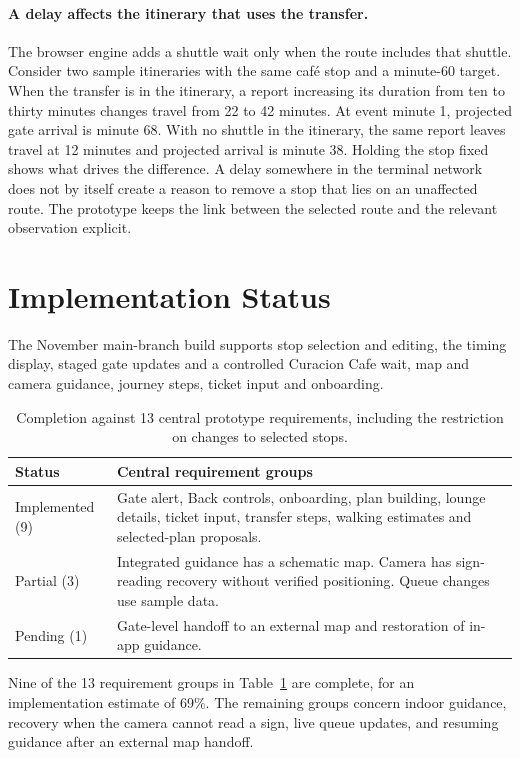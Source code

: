 \documentclass[sigconf,nonacm,balance=false]{acmart}
\begin{document}
\paragraph{A delay affects the itinerary that uses the transfer.}
The browser engine adds a shuttle wait only when the route includes that shuttle. Consider two sample itineraries with the same caf\'e stop and a minute-60 target. When the transfer is in the itinerary, a report increasing its duration from ten to thirty minutes changes travel from 22 to 42 minutes. At event minute 1, projected gate arrival is minute 68. With no shuttle in the itinerary, the same report leaves travel at 12 minutes and projected arrival is minute 38. Holding the stop fixed shows what drives the difference. A delay somewhere in the terminal network does not by itself create a reason to remove a stop that lies on an unaffected route. The prototype keeps the link between the selected route and the relevant observation explicit.

\section{Implementation Status}\label{sec:status}
The November main-branch build supports stop selection and editing, the timing display, staged gate updates and a controlled Curacion Cafe wait, map and camera guidance, journey steps, ticket input and onboarding.

\begin{table}[t]\centering\small
\begin{tabular}{@{}p{}p{}@{}}\toprule
Status & Central requirement groups \\\midrule
Implemented (9) & Gate alert, Back controls, onboarding, plan building, lounge details, ticket input, transfer steps, walking estimates and selected-plan proposals.\\
Partial (3) & Integrated guidance has a schematic map. Camera has sign-reading recovery without verified positioning. Queue changes use sample data.\\
Pending (1) & Gate-level handoff to an external map and restoration of in-app guidance.\\\bottomrule
\end{tabular}
\caption{Completion against 13 central prototype requirements, including the restriction on changes to selected stops.}\label{tab:status}
\end{table}

Nine of the 13 requirement groups in Table~\ref{tab:status} are complete, for an implementation estimate of 69\%. The remaining groups concern indoor guidance, recovery when the camera cannot read a sign, live queue updates, and resuming guidance after an external map handoff.
\end{document}
